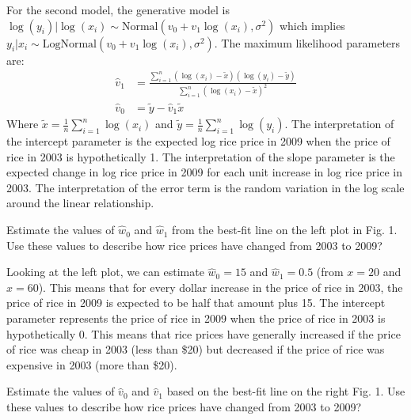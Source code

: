 \documentclass{article}
\begin{document}
\begin{probset}
\begin{prob} 
\begin{subprobset}
\begin{subprob}
\begin{soln}
                For the second model, the generative model is $\log(y_i) | \log(x_i) \sim \text{Normal}(v_0 + v_1 \log(x_i), \sigma^2)$ which implies $y_i | x_i \sim \text{LogNormal}(v_0 + v_1 \log(x_i), \sigma^2)$. The maximum likelihood parameters are:
                \begin{align*}
                    \hat{v}_1 &= \frac{\sum_{i=1}^n (\log(x_i) - \tilde{x})(\log(y_i) - \tilde{y})}{\sum_{i=1}^n (\log(x_i) - \tilde{x})^2} \\
                    \hat{v}_0 &= \tilde{y} - \hat{v}_1 \tilde{x}
                \end{align*}
                Where $\tilde{x} = \frac{1}{n} \sum_{i=1}^n \log(x_i)$ and $\tilde{y} = \frac{1}{n} \sum_{i=1}^n \log(y_i)$. The interpretation of the intercept parameter is the expected log rice price in 2009 when the price of rice in 2003 is hypothetically 1. The interpretation of the slope parameter is the expected change in log rice price in 2009 for each unit increase in log rice price in 2003. The interpretation of the error term is the random variation in the log scale around the linear relationship.
            \end{soln}
        \end{subprob}

        \begin{subprob}
            Estimate the values of $\hat{w}_0$ and $\hat{w}_1$ from the best-fit line on the left plot in Fig. 1. Use these values to describe how rice prices have changed from 2003 to 2009?

            \begin{soln}
                Looking at the left plot, we can estimate $\hat{w}_0 = 15$ and $\hat{w}_1 = 0.5$ (from $x = 20$ and $x = 60$). This means that for every dollar increase in the price of rice in 2003, the price of rice in 2009 is expected to be half that amount plus 15. The intercept parameter represents the price of rice in 2009 when the price of rice in 2003 is hypothetically 0. This means that rice prices have generally increased if the price of rice was cheap in 2003 (less than \$20) but decreased if the price of rice was expensive in 2003 (more than \$20).
            \end{soln}
        \end{subprob}
        
        \begin{subprob}
            Estimate the values of $\hat{v}_0$ and $\hat{v}_1$ based on the best-fit line on the right Fig. 1. Use these values to describe how rice prices have changed from 2003 to 2009?


\end{subprob}
\end{subprobset}
\end{prob}
\end{probset}
\end{document}
